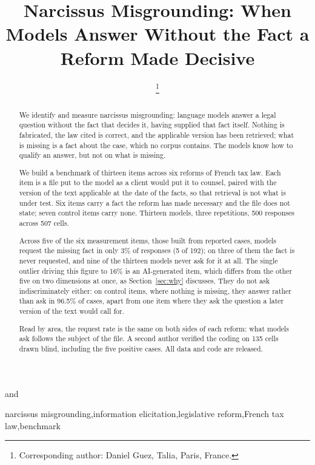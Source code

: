 \documentclass{IOS-Book-Article}
\begin{document}
\pagestyle{headings}
\def\thepage{}
\begin{frontmatter}              %

\title{Narcissus Misgrounding: When Models Answer Without the Fact a Reform Made Decisive}

\markboth{}{}

\author[A]{ \thanks{Corresponding author: Daniel Guez, Talia, Paris, France.}}
and
\author[A]{ }

\address[A]{Talia, Paris, France}

\begin{abstract}
We identify and measure narcissus misgrounding: language models answer a legal question without the fact that decides it, having supplied that fact itself. Nothing is fabricated, the law cited is correct, and the applicable version has been retrieved; what is missing is a fact about the case, which no corpus contains. The models know how to qualify an answer, but not on what is missing.

We build a benchmark of thirteen items across six reforms of French tax law. Each item is a file put to the model as a client would put it to counsel, paired with the version of the text applicable at the date of the facts, so that retrieval is not what is under test. Six items carry a fact the reform has made necessary and the file does not state; seven control items carry none. Thirteen models, three repetitions, 500 responses across 507 cells.

Across five of the six measurement items, those built from reported cases, models request the missing fact in only 3\% of responses (5 of 192); on three of them the fact is never requested, and nine of the thirteen models never ask for it at all. The single outlier driving this figure to 16\% is an AI-generated item, which differs from the other five on two dimensions at once, as Section~\ref{sec:why} discusses. They do not ask indiscriminately either: on control items, where nothing is missing, they answer rather than ask in 96.5\% of cases, apart from one item where they ask the question a later version of the text would call for.

Read by area, the request rate is the same on both sides of each reform: what models ask follows the subject of the file. A second author verified the coding on 135 cells drawn blind, including the five positive cases. All data and code are released.
\end{abstract}

\begin{keyword}
narcissus misgrounding\sep information elicitation\sep legislative reform\sep French tax law\sep benchmark
\end{keyword}
\end{frontmatter}
\markboth{}{}
\end{document}
